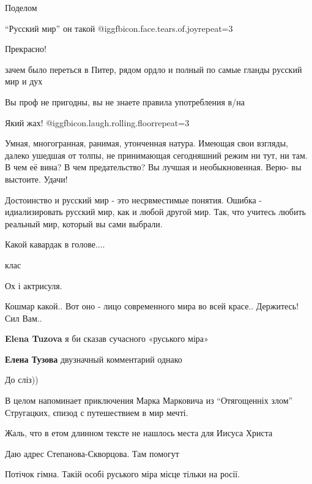 \begin{itemize}
Поделом

\enquote{Русский мир} он такой @igg{fbicon.face.tears.of.joy}{repeat=3} 

Прекрасно!

зачем было переться в Питер, рядом ордло и полный по самые гланды русский мир и дух

Вы проф не пригодны, вы не знаете правила употребления в/на

Який жах!  @igg{fbicon.laugh.rolling.floor}{repeat=3} 


Умная, многогранная, ранимая, утонченная натура. Имеющая свои взгляды, далеко
ушедшая от толпы, не принимающая сегодняшний режим ни тут, ни там. В чем её
вина? В чем предательство? Вы лучшая и необыкновенная. Верю- вы выстоите.
Удачи!


Достоинство и русский мир - это несрвместимые понятия. Ошибка - идиализировать
русский мир, как и любой другой мир. Так, что учитесь любить реальный мир,
который вы сами выбрали.

Какой кавардак в голове....

клас

Ох і актрисуля.

Кошмар какой.. Вот оно - лицо современного мира во всей красе.. Держитесь! Сил Вам..

\begin{itemize} %
\textbf{Elena Tuzova} я би сказав сучасного «руського міра»

\textbf{Елена Тузова} двузначный комментарий однако
\end{itemize} %

До сліз))

В целом напоминает приключения Марка Марковича из \enquote{Отягощенніх злом} Стругацких, єпизод с путешествием в мир мечті.

Жаль, что в етом длинном тексте не нашлось места для Иисуса Христа

Даю адрес Степанова-Скворцова.
Там помогут

Потічок гімна. Такій особі руського міра місце тільки на росії.


\end{itemize}
